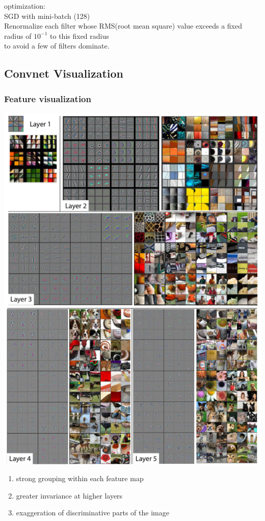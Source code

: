 \documentclass[11pt]{article}
\begin{document}
optimization: \\
SGD with mini-batch (128) \\

Renormalize each filter whose RMS(root mean square) value exceeds a fixed radius of $10^{-1}$ to this fixed radius \\
to avoid a few of filters dominate. \\

\subsection{Convnet Visualization}
\label{sec-3-4}
\subsubsection{Feature visualization}
\label{sec-3-4-1}
\includegraphics[width=.9\linewidth]{pics/cnn-feature-visualization.png} \\
\includegraphics[width=.9\linewidth]{pics/cnn-feature-visualization2.png} \\
\begin{enumerate}
\item strong grouping within each feature map \\
\item greater invariance at higher layers \\
\item exaggeration of discriminative parts of the image \\
\end{enumerate}
\end{document}

